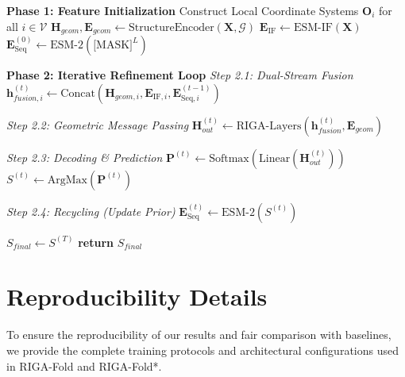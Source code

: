 \documentclass{article}
\theoremstyle{plain}
\theoremstyle{definition}
\theoremstyle{remark}
\begin{document}
{\begin{algorithm}[h]
\begin{algorithmic}[1]
   \STATE \textbf{Phase 1: Feature Initialization}
   \STATE Construct Local Coordinate Systems $\mathbf{O}_i$ for all $i \in \mathcal{V}$
   \STATE $\mathbf{H}_{geom}, \mathbf{E}_{geom} \leftarrow \text{StructureEncoder}(\mathbf{X}, \mathcal{G})$ 
   \STATE $\mathbf{E}_{\text{IF}} \leftarrow \text{ESM-IF}(\mathbf{X})$ 
   \STATE $\mathbf{E}_{\text{Seq}}^{(0)} \leftarrow \text{ESM-2}(\text{[MASK]}^L)$ 
   
   \STATE \textbf{Phase 2: Iterative Refinement Loop}
       \STATE \textit{Step 2.1: Dual-Stream Fusion}
           \STATE $\mathbf{h}_{fusion, i}^{(t)} \leftarrow \text{Concat}(\mathbf{H}_{geom, i}, \mathbf{E}_{\text{IF}, i}, \mathbf{E}_{\text{Seq}, i}^{(t-1)})$
       \ENDFOR
       
       \STATE \textit{Step 2.2: Geometric Message Passing}
       \STATE $\mathbf{H}_{out}^{(t)} \leftarrow \text{RIGA-Layers}(\mathbf{h}_{fusion}^{(t)}, \mathbf{E}_{geom})$
       
       \STATE \textit{Step 2.3: Decoding \& Prediction}
       \STATE $\mathbf{P}^{(t)} \leftarrow \text{Softmax}(\text{Linear}(\mathbf{H}_{out}^{(t)}))$
       \STATE $S^{(t)} \leftarrow \text{ArgMax}(\mathbf{P}^{(t)})$
       
       \STATE \textit{Step 2.4: Recycling (Update Prior)}
           \STATE $\mathbf{E}_{\text{Seq}}^{(t)} \leftarrow \text{ESM-2}(S^{(t)})$ 
       \ENDIF
   \ENDFOR
   
   \STATE $S_{final} \leftarrow S^{(T)}$
   \STATE \textbf{return} $S_{final}$
\end{algorithmic}
\end{algorithm}

\section{Reproducibility Details}
\label{sec:repro_details}

To ensure the reproducibility of our results and fair comparison with baselines, we provide the complete training protocols and architectural configurations used in RIGA-Fold and RIGA-Fold*.

}
\end{document}
